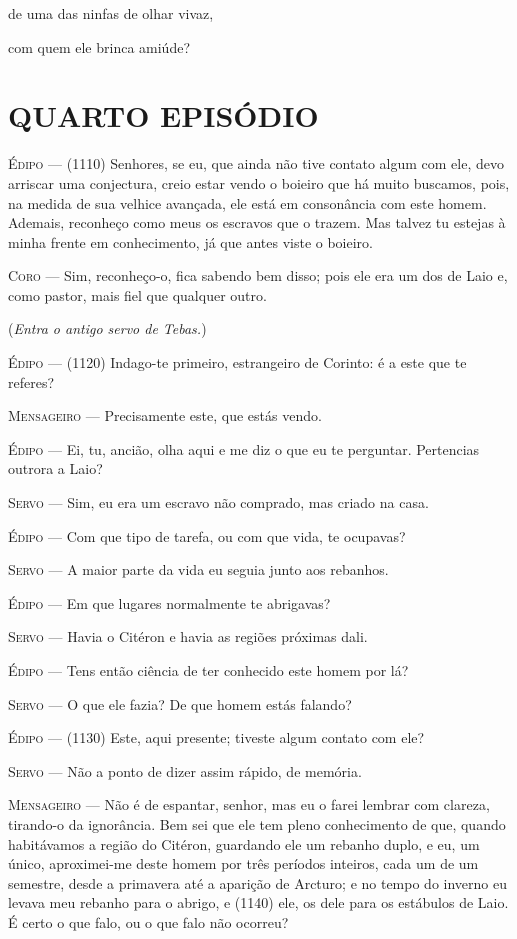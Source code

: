de uma das ninfas de olhar vivaz,

com quem ele brinca amiúde?

\section{QUARTO EPISÓDIO}

\textsc{Édipo} --- (1110) Senhores, se eu, que ainda não tive contato algum com ele, devo
arriscar uma conjectura, creio estar vendo o boieiro que há muito
buscamos, pois, na medida de sua velhice avançada, ele está em
consonância com este homem. Ademais, reconheço como meus os escravos que
o trazem. Mas talvez tu estejas à minha frente em conhecimento, já que
antes viste o boieiro.

\textsc{Coro} --- Sim, reconheço-o, fica sabendo bem disso; pois ele era um dos de Laio e,
como pastor, mais fiel que qualquer outro.

(\emph{Entra o antigo servo de Tebas.})

\textsc{Édipo} --- (1120) Indago-te primeiro, estrangeiro de Corinto: é a este que te
referes?

\textsc{Mensageiro} --- Precisamente este, que estás vendo.

\textsc{Édipo} --- Ei, tu, ancião, olha aqui e me diz o que eu te perguntar. Pertencias
outrora a Laio?

\textsc{Servo} --- Sim, eu era um escravo não comprado, mas criado na casa.

\textsc{Édipo} --- Com que tipo de tarefa, ou com que vida, te ocupavas?

\textsc{Servo} --- A maior parte da vida eu seguia junto aos rebanhos.

\textsc{Édipo} --- Em que lugares normalmente te abrigavas?

\textsc{Servo} --- Havia o Citéron e havia as regiões próximas dali.

\textsc{Édipo} --- Tens então ciência de ter conhecido este homem por lá?

\textsc{Servo} --- O que ele fazia? De que homem estás falando?

\textsc{Édipo} --- (1130) Este, aqui presente; tiveste algum contato com ele?

\textsc{Servo} --- Não a ponto de dizer assim rápido, de memória.

\textsc{Mensageiro} --- Não é de espantar, senhor, mas eu o farei lembrar com clareza, tirando-o
da ignorância. Bem sei que ele tem pleno conhecimento de que, quando
habitávamos a região do Citéron, guardando ele um rebanho duplo, e eu,
um único, aproximei-me deste homem por três períodos inteiros, cada um
de um semestre, desde a primavera até a aparição de Arcturo; e no tempo
do inverno eu levava meu rebanho para o abrigo, e (1140) ele, os dele
para os estábulos de Laio. É certo o que falo, ou o que falo não
ocorreu?

